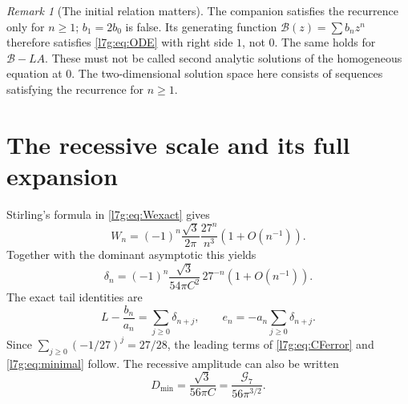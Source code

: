 \documentclass[11pt,letterpaper]{article}
\theoremstyle{remark}\newtheorem{remark}[theorem]{Remark}
\newcommand{\G}{\mathcal G_7}\newcommand{\Ast}{A_\star}
\newcounter{l7gtrsavedeq}
\begin{document}
\begin{remark}[The initial relation matters]
The companion satisfies the recurrence only for $n\ge1$;
$b_1=2b_0$ is false. Its generating function
$\mathcal B(z)=\sum b_nz^n$ therefore satisfies \eqref{l7g:eq:ODE} with right
side $1$, not $0$. The same holds for $\mathcal B-LA$.
These must not be called second analytic solutions of the homogeneous
equation at $0$. The two-dimensional solution space here consists of
sequences satisfying the recurrence for $n\ge1$.
\end{remark}

\section{The recessive scale and its full expansion}\label{l7g:sec:recessive}
Stirling's formula in \eqref{l7g:eq:Wexact} gives
\begin{equation}\label{l7g:eq:Wasym}
 W_n=(-1)^n\frac{\sqrt3}{2\pi}\frac{27^n}{n^3}(1+O(n^{-1})).
\end{equation}
Together with the dominant asymptotic this yields
\begin{equation}\label{l7g:eq:deltaasym}
 \delta_n=(-1)^n\frac{\sqrt3}{54\pi C^2}\,27^{-n}(1+O(n^{-1})).
\end{equation}
The exact tail identities are
\begin{equation}\label{l7g:eq:etail}
 L-\frac{b_n}{a_n}=\sum_{j\ge0}\delta_{n+j},\qquad
 e_n=-a_n\sum_{j\ge0}\delta_{n+j}.
\end{equation}
Since $\sum_{j\ge0}(-1/27)^j=27/28$, the leading terms of
\eqref{l7g:eq:CFerror} and \eqref{l7g:eq:minimal} follow. The recessive amplitude
can also be written
\begin{equation}\label{l7g:eq:Dgamma}
 D_{\min}=\frac{\sqrt3}{56\pi C}=\frac{\G}{56\pi^{3/2}}.
\end{equation}
\end{document}
